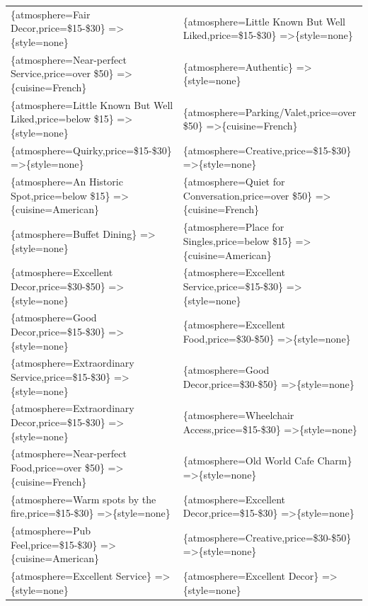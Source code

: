 \documentclass[letterpaper,10pt]{article}
\begin{document}
\begin{appendices}
\begin{table}[h]
\begin{adjustbox}{max width=\textwidth}
\begin{tabular}{ll}
\{atmosphere=Fair Decor,price=\$15-\$30\} =\textgreater \{style=none\} & \{atmosphere=Little Known But Well Liked,price=\$15-\$30\} =\textgreater \{style=none\} \\ 
\{atmosphere=Near-perfect Service,price=over \$50\} =\textgreater \{cuisine=French\} & \{atmosphere=Authentic\} =\textgreater \{style=none\} \\ 
\{atmosphere=Little Known But Well Liked,price=below \$15\} =\textgreater \{style=none\} & \{atmosphere=Parking/Valet,price=over \$50\} =\textgreater \{cuisine=French\} \\ 
\{atmosphere=Quirky,price=\$15-\$30\} =\textgreater \{style=none\} & \{atmosphere=Creative,price=\$15-\$30\} =\textgreater \{style=none\} \\ 
\{atmosphere=An Historic Spot,price=below \$15\} =\textgreater \{cuisine=American\} & \{atmosphere=Quiet for Conversation,price=over \$50\} =\textgreater \{cuisine=French\} \\ 
\{atmosphere=Buffet Dining\} =\textgreater \{style=none\} & \{atmosphere=Place for Singles,price=below \$15\} =\textgreater \{cuisine=American\} \\ 
\{atmosphere=Excellent Decor,price=\$30-\$50\} =\textgreater \{style=none\} & \{atmosphere=Excellent Service,price=\$15-\$30\} =\textgreater \{style=none\} \\ 
\{atmosphere=Good Decor,price=\$15-\$30\} =\textgreater \{style=none\} & \{atmosphere=Excellent Food,price=\$30-\$50\} =\textgreater \{style=none\} \\ 
\{atmosphere=Extraordinary Service,price=\$15-\$30\} =\textgreater \{style=none\} & \{atmosphere=Good Decor,price=\$30-\$50\} =\textgreater \{style=none\} \\ 
\{atmosphere=Extraordinary Decor,price=\$15-\$30\} =\textgreater \{style=none\} & \{atmosphere=Wheelchair Access,price=\$15-\$30\} =\textgreater \{style=none\} \\ 
\{atmosphere=Near-perfect Food,price=over \$50\} =\textgreater \{cuisine=French\} & \{atmosphere=Old World Cafe Charm\} =\textgreater \{style=none\} \\ 
\{atmosphere=Warm spots by the fire,price=\$15-\$30\} =\textgreater \{style=none\} & \{atmosphere=Excellent Decor,price=\$15-\$30\} =\textgreater \{style=none\} \\ 
\{atmosphere=Pub Feel,price=\$15-\$30\} =\textgreater \{cuisine=American\} & \{atmosphere=Creative,price=\$30-\$50\} =\textgreater \{style=none\} \\ 
\{atmosphere=Excellent Service\} =\textgreater \{style=none\} & \{atmosphere=Excellent Decor\} =\textgreater \{style=none\} \\ 

\end{tabular}
\end{adjustbox}
\end{table}
\end{appendices}
\end{document}
